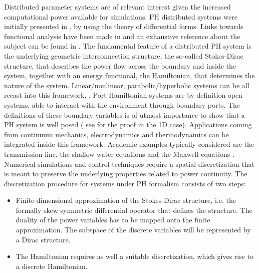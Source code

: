 \documentclass[preprint,12pt]{elsarticle}
\begin{document}
	
	Distributed parameter systems are of relevant interest given the increased computational power available for simulations. PH distributed systems were initially presented in \cite{VANDERSCHAFT2002166}, by using the theory of differential forms. Links towards functional analysis have been made in \cite{Villegas} and an exhaustive reference about the subject can be found in \cite{BookZwart}. The fundamental feature of a distributed PH system is the underlying geometric interconnection structure, the so-called Stokes-Dirac structure, that describes the power flow across the boundary and inside the system, together with an energy functional, the Hamiltonian, that determines the nature of the system. Linear/nonlinear, parabolic/hyperbolic systems can be all recast into this framework, \cite{bookPHs}. Port-Hamiltonian systems are by definition open systems, able to interact with the environment through boundary ports. The definitions of these boundary variables is of utmost importance to show that a PH system is well posed ( see \cite{LeGorrec2005} for the proof in the 1D case). Applications coming from continuum mechanics, electrodynamics and thermodynamics can be integrated inside this framework. Academic examples typically considered are the transmission line, the shallow water equations and the Maxwell equations \cite{VANDERSCHAFT2002166}. \\
	
	Numerical simulations and control techniques require a spatial discretization that is meant to preserve the underlying properties related to power continuity. The discretization procedure for systems under PH formalism consists of two steps:
	\begin{itemize}
		\item Finite-dimensional approximation of the Stokes-Dirac structure, i.e. the formally skew symmetric differential operator that defines the structure. The duality of the power variables has to be mapped onto the finite approximation. The subspace of the discrete variables will be represented by a Dirac structure. 
		\item The Hamiltonian requires as well a suitable discretization, which gives rise to a discrete Hamiltonian. 
	\end{itemize} 
	
\end{document}
